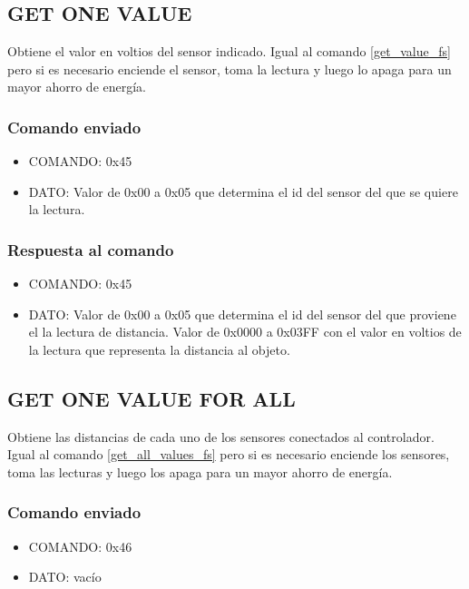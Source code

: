 \documentclass[a4paper,10pt]{article}
\begin{document}
\subsection{GET ONE VALUE}
\label{get_one_value_fs}

Obtiene el valor en voltios del sensor indicado.
Igual al comando \ref{get_value_fs} pero si es necesario enciende el sensor, toma la lectura y luego lo apaga para un mayor ahorro de energ\'ia.

\subsubsection*{Comando enviado}

\begin{itemize}
	\item{COMANDO:} 0x45 
	\item{DATO:} Valor de 0x00 a 0x05 que determina el id del sensor del que se quiere la lectura.
\end{itemize}

\subsubsection*{Respuesta al comando}

\begin{itemize}
	\item{COMANDO:} 0x45
	\item{DATO:} Valor de 0x00 a 0x05 que determina el id del sensor del que proviene el la lectura de distancia.
	Valor de 0x0000 a 0x03FF con el valor en voltios de la lectura que representa la distancia al objeto.
\end{itemize}

\subsection{GET ONE VALUE FOR ALL}
\label{get_one_values_for_all_fs}

Obtiene las distancias de cada uno de los sensores conectados al controlador.
Igual al comando \ref{get_all_values_fs} pero si es necesario enciende los sensores, toma las lecturas y luego los apaga para un mayor ahorro de energ\'ia.

\subsubsection*{Comando enviado}

\begin{itemize}
	\item{COMANDO:} 0x46
	\item{DATO:} vac\'io
\end{itemize}
\end{document}
